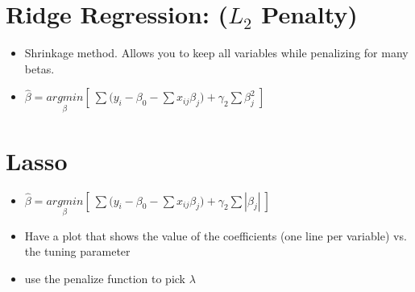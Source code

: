 \documentclass{article}                                                   %
\begin{document}
  \section{Ridge Regression: ($L_2$ Penalty)}
  \begin{itemize}
  \item Shrinkage method. Allows you to keep all 
  variables while penalizing for many betas.
  \item $\hat{\beta} = \underset{\beta}{argmin}[~\sum{(y_i-\beta_0-\sum{x_{ij}\beta_j)}+\gamma_2\sum{\beta_j^2}}~]$
  \end{itemize}

  \section{Lasso}
  \begin{itemize}
  \item $\hat{\beta} = \underset{\beta}{argmin}[~\sum{(y_i-\beta_0-\sum{x_{ij}\beta_j)}+\gamma_2\sum{|\beta_j|}}~]$
  \item Have a plot that shows the value of the coefficients (one line per variable) vs. the tuning parameter
  \item use the penalize function to pick $\lambda$

  \end{itemize}

  
\end{document}

